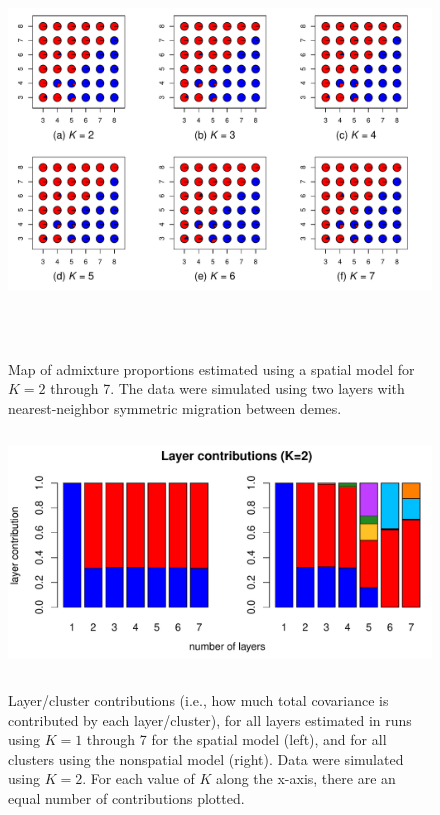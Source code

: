 \documentclass[10pt,letterpaper]{article}
\begin{document}
\begin{figure}
	\centering
		{\includegraphics[width=6in,height=4in]{figs/sims/simK2_sp_pies.pdf}}
	\caption{
	Map of admixture proportions estimated using a spatial model for $K=2$ through 7.
	The data were simulated using two layers with nearest-neighbor symmetric migration between demes.
    }\label{simK2_sp_pies}
\end{figure}

\begin{figure}
	\centering
		{\includegraphics[width=5in,height=2.5in]{figs/sims/simK2_laycon_barplots.pdf}}
		\caption{
			Layer/cluster contributions (i.e., how much total covariance is contributed by each layer/cluster), 
			for all layers estimated in runs using $K = 1$ through 7 
			for the spatial model (left), 
			and for all clusters using the nonspatial model (right).
			Data were simulated using $K=2$.
			For each value of $K$ along the x-axis, there are an equal number of contributions plotted.
		}\label{simK2_laycon}
\end{figure}
\end{document}
